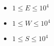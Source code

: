\begin{itemize}
\tightlist
\item $1\le E \le 10^{4}$
\item $1\le W \le 10^{4}$
\item $1\le S \le 10^{4}$
\end{itemize}
